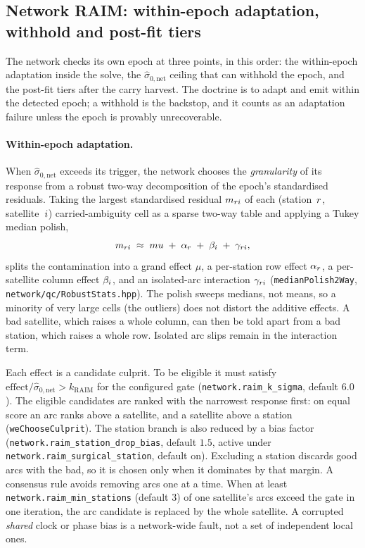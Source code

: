 \documentclass[main.tex]{subfiles}
\begin{document}
\subsection{Network RAIM: within-epoch adaptation, withhold and post-fit tiers}\label{sec:stoch-net-raim}

The network checks its own epoch at three points, in this order: the
within-epoch adaptation inside the solve, the $\hat\sigma_{0,\mathrm{net}}$
ceiling that can withhold the epoch, and the post-fit tiers after the carry
harvest.  The doctrine is to adapt and emit within the detected epoch; a
withhold is the backstop, and it counts as an adaptation failure unless the
epoch is provably unrecoverable.

\paragraph{Within-epoch adaptation.}
When $\hat\sigma_{0,\mathrm{net}}$ exceeds its trigger, the network
chooses the \emph{granularity} of its response from a robust
two-way decomposition of the epoch's standardised residuals.  Taking the
largest
standardised residual $m_{ri}$ of each (station~$r$, satellite~$i$)
carried-ambiguity cell as a sparse two-way table and applying a Tukey median
polish,
\begin{equation}
m_{ri} \;\approx\; mu \;+\; \alpha_{r} \;+\; \beta_{i}
             \;+\; \gamma_{ri},
\label{eq:qc-medpolish}
\end{equation}
splits the contamination into a grand effect $\mu$, a per-station row effect
$\alpha_{r}$, a per-satellite column effect $\beta_{i}$, and an
isolated-arc interaction $\gamma_{ri}$ (\texttt{medianPolish2Way},
\texttt{network/qc/RobustStats.hpp}).  The polish sweeps medians, not
means, so a minority of very large cells (the outliers) does not distort
the additive effects.  A bad satellite, which raises a whole column, can
then be told apart from a bad station, which raises a whole row.
Isolated arc slips remain in the interaction term.

Each effect is a candidate culprit.  To be eligible it must satisfy
$\text{effect}/\hat\sigma_{0,\mathrm{net}} > k_{\mathrm{RAIM}}$ for the
configured gate (\texttt{network.raim\_k\_sigma}, default $6.0$).  The eligible
candidates are ranked with the narrowest response first: on equal score
an arc ranks above a satellite, and a satellite above a station
(\texttt{weChooseCulprit}).  The
station branch is also reduced by a bias factor
(\texttt{network.raim\_station\_drop\_bias}, default $1.5$, active under
\texttt{network.raim\_surgical\_station}, default on).  Excluding a station discards
good arcs with the bad, so it is chosen only when it dominates by that
margin.  A consensus rule avoids removing arcs one at a time.  When at
least \texttt{network.raim\_min\_stations} (default $3$) of one satellite's arcs exceed
the gate in one iteration, the arc candidate is replaced by the whole
satellite.  A corrupted \emph{shared} clock or phase bias is a
network-wide fault, not a set of independent local ones.
\end{document}

